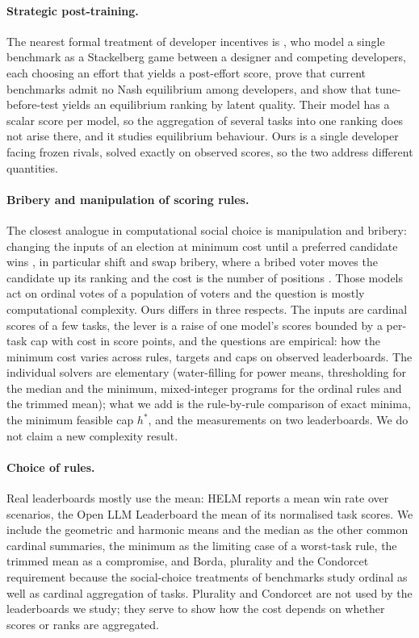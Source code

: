 \paragraph{Strategic post-training.}
The nearest formal treatment of developer incentives is \citet{chen2026incentives}, who model a single benchmark as a Stackelberg game between a designer and competing developers, each choosing an effort that yields a post-effort score, prove that current benchmarks admit no Nash equilibrium among developers, and show that tune-before-test yields an equilibrium ranking by latent quality. Their model has a scalar score per model, so the aggregation of several tasks into one ranking does not arise there, and it studies equilibrium behaviour. Ours is a single developer facing frozen rivals, solved exactly on observed scores, so the two address different quantities.

\paragraph{Bribery and manipulation of scoring rules.}
The closest analogue in computational social choice \citep{brandt2016comsoc} is manipulation and bribery: changing the inputs of an election at minimum cost until a preferred candidate wins \citep{bartholdi1989manipulating,faliszewski2009bribery,faliszewski2010manipulation}, in particular shift and swap bribery, where a bribed voter moves the candidate up its ranking and the cost is the number of positions \citep{elkind2009swap,elkind2020shift}. Those models act on ordinal votes of a population of voters and the question is mostly computational complexity. Ours differs in three respects. The inputs are cardinal scores of a few tasks, the lever is a raise of one model's scores bounded by a per-task cap with cost in score points, and the questions are empirical: how the minimum cost varies across rules, targets and caps on observed leaderboards. The individual solvers are elementary (water-filling for power means, thresholding for the median and the minimum, mixed-integer programs for the ordinal rules and the trimmed mean); what we add is the rule-by-rule comparison of exact minima, the minimum feasible cap $h^\ast$, and the measurements on two leaderboards. We do not claim a new complexity result.

\paragraph{Choice of rules.}
Real leaderboards mostly use the mean: HELM reports a mean win rate over scenarios, the Open LLM Leaderboard the mean of its normalised task scores. We include the geometric and harmonic means and the median as the other common cardinal summaries, the minimum as the limiting case of a worst-task rule, the trimmed mean as a compromise, and Borda, plurality and the Condorcet requirement because the social-choice treatments of benchmarks \citep{zhang2024diversity,lanctot2023social} study ordinal as well as cardinal aggregation of tasks. Plurality and Condorcet are not used by the leaderboards we study; they serve to show how the cost depends on whether scores or ranks are aggregated.
